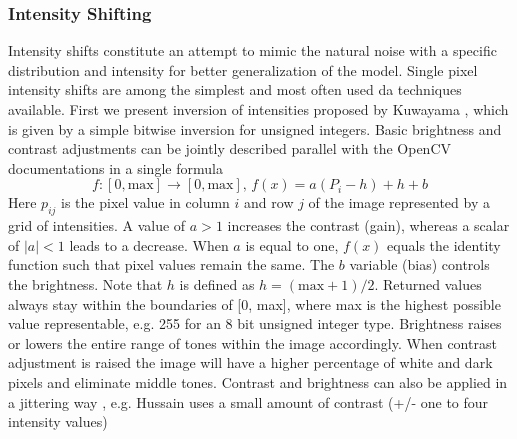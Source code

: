 \subsubsection{Intensity Shifting}

Intensity shifts constitute an attempt to mimic the natural noise with a specific distribution and intensity for better generalization of the model. Single pixel intensity shifts are among the simplest and most often used \acrshort{da} techniques available. First we present inversion of intensities proposed by Kuwayama \cite{Kuwayama.2019}, which is given by a simple bitwise inversion for unsigned integers. Basic brightness and contrast \cite{Kuwayama.2019} adjustments can be jointly described parallel with the OpenCV documentations \cite{CommunityEditors.2022} in a single formula
\begin{equation}
    f\colon [0,\text{max}] \longrightarrow [0,\text{max}] \text{, } f(x) = a(P_i-h)+h+b
\end{equation}
Here \( p_{ij} \) is the pixel value in column \( i \) and row \( j \) of the image represented by a grid of intensities. A value of \( a > 1 \) increases the contrast (gain), whereas a scalar of \( |a| < 1 \) leads to a decrease. When \( a \) is equal to one, \( f(x) \) equals the identity function such that pixel values remain the same. The \( b \) variable (bias) controls the brightness. Note that \( h \) is defined as \( h = (\text{max}+1)/2 \). Returned values always stay within the boundaries of [0, max], where max is the highest possible value representable, e.g. 255 for an 8 bit unsigned integer type. Brightness raises or lowers the entire range of tones within the image accordingly. When contrast adjustment is raised the image will have a higher percentage of white and dark pixels and eliminate middle tones. Contrast and brightness can also be applied in a jittering way \cite{hussain.2018}, e.g. Hussain uses a small amount of contrast (+/- one to four intensity values)

